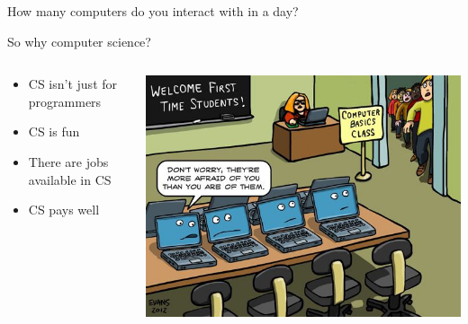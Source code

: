 \documentclass[aspectratio=169]{beamer}
\begin{document}
\begin{frame}{How many computers do you interact with in a day?}
\end{frame}


\begin{frame}{So why computer science?}
    \begin{columns}
        \begin{column}{0.5\textwidth}
            \begin{itemize}[label=--]
                \item CS isn't just for programmers
                \item CS is fun
                \item There are jobs available in CS
                \item CS pays well
            \end{itemize}
        \end{column}
        \begin{column}{0.5\textwidth}
            \centering
            \includegraphics[width=\linewidth]{more_afraid_comic.jpg}
        \end{column}
    \end{columns}
\end{frame}
\end{document}
